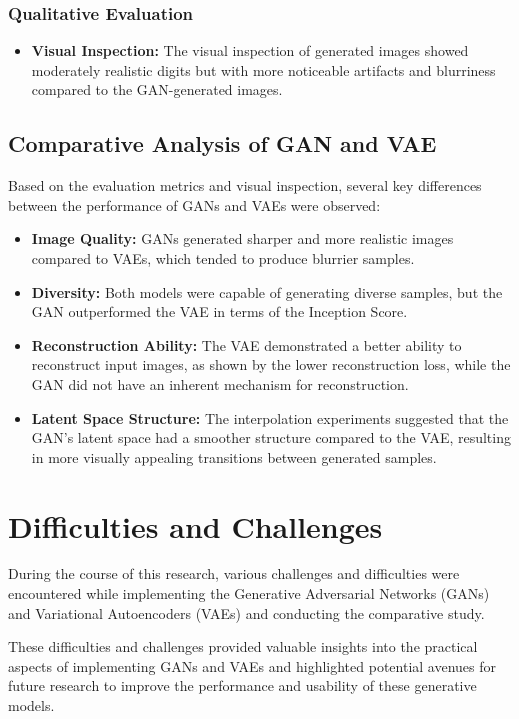 \documentclass{article}
\begin{document}
\subsubsection{Qualitative Evaluation}
\begin{itemize}
    \item \textbf{Visual Inspection:} The visual inspection of generated images showed moderately realistic digits but with more noticeable artifacts and blurriness compared to the GAN-generated images.
\end{itemize}

\subsection{Comparative Analysis of GAN and VAE}
Based on the evaluation metrics and visual inspection, several key differences between the performance of GANs and VAEs were observed:
\begin{itemize}
    \item \textbf{Image Quality:} GANs generated sharper and more realistic images compared to VAEs, which tended to produce blurrier samples.
    \item \textbf{Diversity:} Both models were capable of generating diverse samples, but the GAN outperformed the VAE in terms of the Inception Score.
    \item \textbf{Reconstruction Ability:} The VAE demonstrated a better ability to reconstruct input images, as shown by the lower reconstruction loss, while the GAN did not have an inherent mechanism for reconstruction.
    \item \textbf{Latent Space Structure:} The interpolation experiments suggested that the GAN's latent space had a smoother structure compared to the VAE, resulting in more visually appealing transitions between generated samples.
\end{itemize}


\section{Difficulties and Challenges}
During the course of this research, various challenges and difficulties were encountered while implementing the Generative Adversarial Networks (GANs) and Variational Autoencoders (VAEs) and conducting the comparative study.

These difficulties and challenges provided valuable insights into the practical aspects of implementing GANs and VAEs and highlighted potential avenues for future research to improve the performance and usability of these generative models.
\end{document}

